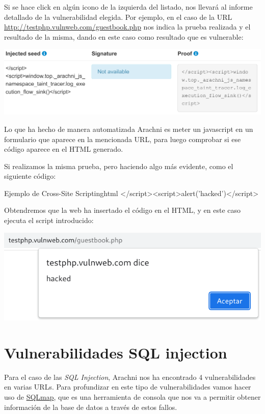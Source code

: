 \documentclass{\ClassPath/viu-tfm-template}
\begin{document}
Si se hace click en algún icono de la izquierda del listado, nos llevará al informe detallado de la vulnerabilidad elegida. Por ejemplo, en el caso de la URL \href{http://testphp.vulnweb.com/guestbook.php}{http://testphp.vulnweb.com/guestbook.php} nos indica la prueba realizada y el resultado de la misma, dando en este caso como resultado que es vulnerable:

\begin{center}
    \vspace{-20pt}
    \includegraphics[frame,width=0.9\linewidth]{img/informe_xss.png}
\end{center}

Lo que ha hecho de manera automatizada Arachni es meter un javascript en un formulario que aparece en la mencionada URL, para luego comprobar si ese código aparece en el HTML generado.

Si realizamos la misma prueba, pero haciendo algo más evidente, como el siguiente código:

\begin{mycode}{Ejemplo de Cross-Site Scripting}{html}{}
</script><script>alert('hacked')</script>
\end{mycode}

Obtendremos que la web ha insertado el código en el HTML, y en este caso ejecuta el script introducido:

\vspace{15pt}
\begin{center}
    \vspace{-20pt}
    \includegraphics[width=0.7\linewidth]{img/ejemplo_xss.png}
\end{center}



\chapter{Vulnerabilidades SQL injection}
Para el caso de las \textit{SQL Injection}, Arachni nos ha encontrado 4 vulnerabilidades en varias URLs. Para profundizar en este tipo de vulnerabilidades vamos hacer uso de \href{https://sqlmap.org/}{SQLmap}, que es una herramienta de consola que nos va a permitir obtener información de la base de datos a través de estos fallos.
\end{document}
